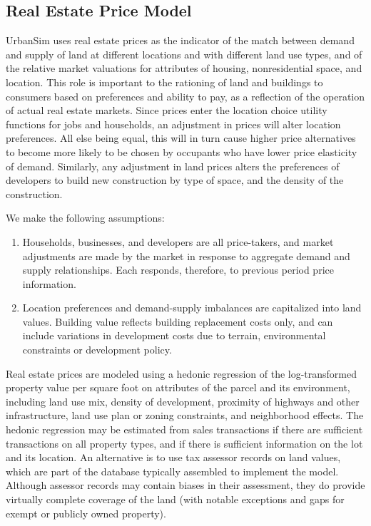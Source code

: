 \subsection{Real Estate Price Model}

UrbanSim uses real estate prices as the indicator of the match between
demand and supply of land at different locations and with
different land use types, and of the relative market valuations
for attributes of housing, nonresidential space, and location.
This role is important to the rationing of land and buildings to
consumers based on preferences and ability to pay, as a reflection
of the operation of actual real estate markets. Since prices enter
the location choice utility functions for jobs and households, an
adjustment in prices will alter location preferences.  All else
being equal, this will in turn cause higher price alternatives to
become more likely to be chosen by occupants who have lower price
elasticity of demand. Similarly, any adjustment in land prices
alters the preferences of developers to build new construction by
type of space, and the density of the construction.

We make the following assumptions:

\begin{enumerate}
\item Households, businesses, and developers are all
price-takers, and market adjustments are made by the market in
response to aggregate demand and supply relationships.  Each
responds, therefore, to previous period price information.

\item
Location preferences and demand-supply imbalances are capitalized
into land values.  Building value reflects building replacement
costs only, and can include variations in development costs due to
terrain, environmental constraints or development policy.

\end{enumerate}

Real estate prices are modeled using a hedonic regression of the log-transformed
property value per square foot
on attributes of the parcel and its environment, including land use
mix, density of development, proximity of highways and other
infrastructure, land use plan or zoning constraints, and
neighborhood effects.  The hedonic regression may be estimated
from sales transactions if there are sufficient transactions on
all property types, and if there is sufficient information on the
lot and its location.  An alternative is to use tax assessor
records on land values, which are part of the database typically
assembled to implement the model.  Although assessor records may
contain biases in their assessment, they do provide virtually
complete coverage of the land (with notable exceptions and gaps
for exempt or publicly owned property).

